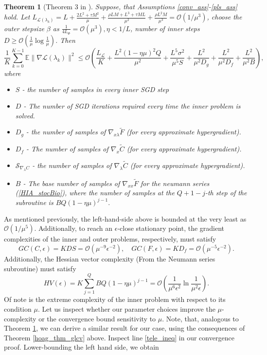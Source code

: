\documentclass[11pt, twoside]{report}
\newtheorem{theorem}{Theorem}[section]
\begin{document}
\begin{theorem}[Theorem 3 in \cite{ji2021bilevel}] \label{thm3}
    Suppose, that Assumptions \ref{conv_ass}-\ref{pls_ass} hold. Let $L_{\mathcal{L}(\lambda_k)} = L + \frac{2L^2 + \tau M^2}{\mu} + \frac{\rho L M + L^3 + \tau M L}{\mu^2} + \frac{\rho L^2 M}{\mu^3} = \mathcal{O}(1/\mu^3)$, choose the outer stepsize $\beta$ as $\frac{1}{4 L_\Phi} = \mathcal{O}(\mu^3), \eta < 1/L$, number of inner steps $D \geq \mathcal{O}(\frac{1}{\mu} \log{\frac{1}{\mu}})$. Then
    \[\frac{1}{K} \sum_{k=0}^{K-1} \mathbb{E} \|\nabla \mathcal{L} (\lambda_k)\|^2 \leq \mathcal{O}\left( \frac{L_{\mathcal{L}}}{K} + \frac{L^2(1-\eta \mu)^2Q}{\mu^2} + \frac{L^5 \sigma^2}{\mu^5 S} + \frac{L^2}{\mu^2 D_g} + \frac{L^2}{\mu^2 D_f} + \frac{L^2}{
    \mu^2 B} \right),\]
    where
    \begin{itemize}
        \item $S$ - the number of samples in every inner SGD step
        \item $D$ - The number of SGD iterations required every time the inner problem is solved.
        \item $D_g$ - the number of samples of $\nabla_{x\lambda} \tilde{F}$ (for every approximate hypergradient).
        \item $D_f$ - The number of samples of $\nabla_x \tilde{C}$ (for every approximate hypergradient).
        \item $\mathcal{S}_{\nabla_\lambda C}$ - the number of samples of $\nabla_{\lambda} \tilde{C}$ (for every approximate hypergradient).
        \item $B$ - The base number of samples of $\nabla_{xx} \tilde{F}$ for the neumann series (\ref{HIA_stocBio}), where the number of samples at the $Q+1-j$-th step of the subroutine is $BQ(1-\eta\mu)^{j-1}.$
    \end{itemize}
\end{theorem}
As mentioned previously, the left-hand-side above is bounded at the very least as $\mathcal{O}(1 / \mu^5)$. Additionally, to reach an $\epsilon$-close stationary point, the gradient complexities of the inner and outer problems, respectively, must satisfy
\[GC(C,\epsilon) = KDS = \mathcal{O}(\mu^{-9} \epsilon^{-2}), \quad GC(F,\epsilon) = KD_f = \mathcal{O} (\mu^{-5} \epsilon^{-2}). \]
Additionally, the Hessian vector complexity (From the Neumann series subroutine) must satisfy
\[HV(\epsilon) = K \sum_{j=1}^Q B Q(1-\eta \mu)^{j-1} = \mathcal{O}\left(\frac{1}{\mu^6\epsilon^2} \ln \frac{1}{\mu^2\epsilon}\right).\]
Of note is the extreme complexity of the inner problem with respect to its condition $\mu$. Let us inspect whether our parameter choices improve the $\mu$-complexity or the convergence bound sensitivity to $\mu$. Note, that, analogous to Theorem \ref{thm3}, we can derive a similar result for our case, using the consequences of Theorem \ref{hoag_thm_glcv} above. Inspect line \ref{tele_ineq} in our convergence proof. Lower-bounding the left hand side, we obtain
\end{document}
